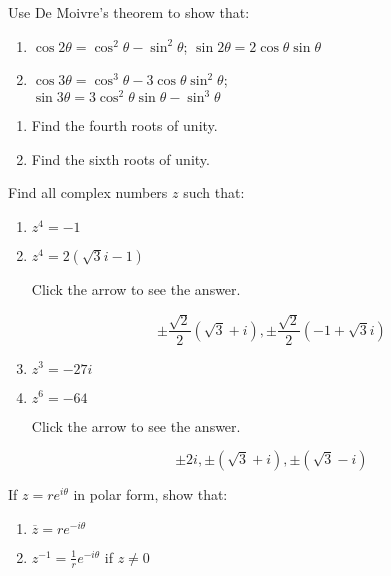 \documentclass{ximera}
\begin{document}
\begin{problem}\label{prb:A.21}
Use De Moivre's theorem to show that:

\begin{enumerate}[label={\alph*.}]
\item $\cos 2\theta = \cos^{2} \theta - \sin^{2} \theta$; $\sin 2\theta = 2 \cos \theta \sin \theta$

\item $\cos 3\theta = \cos^{3} \theta - 3 \cos \theta \sin^{2} \theta$; \\
$\sin 3\theta = 3 \cos^2 \theta \sin \theta - \sin^3 \theta$

\end{enumerate}
\end{problem}

\begin{problem}\label{prb:A.22}
\begin{enumerate}[label={\alph*.}]
\item Find the fourth roots of unity.

\item Find the sixth roots of unity.

\end{enumerate}
\end{problem}

\begin{problem}\label{prb:A.23}
Find all complex numbers $z$ such that:

\begin{enumerate}
\item $z^{4} = -1$
\item $z^{4} = 2(\sqrt{3}i - 1)$

Click the arrow to see the answer.
\begin{expandable}{}{}
 $$\pm \frac{\sqrt{2}}{2}(\sqrt{3}+i), \pm \frac{\sqrt{2}}{2}(-1 + \sqrt{3}i)$$
\end{expandable}

\item $z^{3} = -27i$
\item $z^{6} = -64$

Click the arrow to see the answer.
\begin{expandable}{}{}
$$\pm 2i, \pm (\sqrt{3} +i), \pm (\sqrt{3}-i)$$
\end{expandable}

\end{enumerate}
\end{problem}

\begin{problem}\label{prb:A.24}
If $z = re^{i\theta}$ in polar form, show that:

\begin{enumerate}
\item $\overline{z} = re^{-i\theta}$
\item $z^{-1}  = \frac{1}{r} e^{-i\theta}$ if  $z \neq 0 $
\end{enumerate}
\end{problem}
\end{document}
